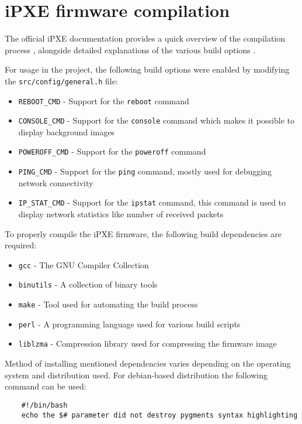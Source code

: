 \documentclass[../main.tex]{subfiles}
\begin{document}
\section{iPXE firmware compilation}

The official iPXE documentation provides a quick overview of the compilation process \cite{ipxe_compilation_guide},
alongside detailed explanations of the various build options \cite{ipxe_build_options}.

For usage in the project, the following build options were enabled by modifying the \texttt{src/config/general.h} file:

\begin{itemize}
  \item \texttt{REBOOT\_CMD}   - Support for the \texttt{reboot} command
  \item \texttt{CONSOLE\_CMD}  - Support for the \texttt{console} command which makes it possible to display background images
  \item \texttt{POWEROFF\_CMD} - Support for the \texttt{poweroff} command
  \item \texttt{PING\_CMD}     - Support for the \texttt{ping} command, mostly used for debugging network connectivity
  \item \texttt{IP\_STAT\_CMD} - Support for the \texttt{ipstat} command, this command is used to display network statistics like number of received packets
\end{itemize}

To properly compile the iPXE firmware, the following build dependencies are required:

\begin{itemize}
  \item \texttt{gcc}      - The GNU Compiler Collection
  \item \texttt{binutils} - A collection of binary tools
  \item \texttt{make}     - Tool used for automating the build process
  \item \texttt{perl}     - A programming language used for various build scripts
  \item \texttt{liblzma}  - Compression library used for compressing the firmware image
\end{itemize}

Method of installing mentioned dependencies varies depending on the operating system and distribution used.
For debian-based distribution the following command can be used:

% 


\begin{verbatim}
    #!/bin/bash
    echo the $# parameter did not destroy pygments syntax highlighting
\end{verbatim}

\end{document}
